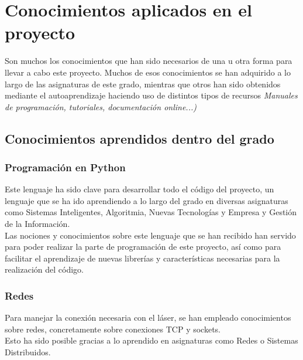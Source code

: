 
\section{Conocimientos aplicados en el proyecto}

Son muchos los conocimientos que han sido necesarios de una u otra forma para llevar a cabo este proyecto. Muchos de esos conocimientos se han adquirido a lo largo de las asignaturas de este grado, mientras que otros han sido obtenidos mediante el autoaprendizaje haciendo uso de distintos tipos de recursos \textit{Manuales de programación, tutoriales, documentación online...)}\\
	
\subsection{Conocimientos aprendidos dentro del grado}
	\subsubsection{Programación en Python}
		Este lenguaje ha sido clave para desarrollar todo el código del proyecto, un lenguaje que se ha ido aprendiendo a lo largo del grado en diversas asignaturas como Sistemas 					Inteligentes, Algoritmia, Nuevas Tecnologías y Empresa y Gestión de la Información.\\
		Las nociones y conocimientos sobre este lenguaje que se han recibido han servido para poder realizar la parte de programación de este proyecto, así como para facilitar el 					aprendizaje de nuevas librerías y características necesarias para la realización del código.\\
	\subsubsection{Redes}
		Para manejar la conexión necesaria con el láser, se han empleado conocimientos sobre redes, concretamente sobre conexiones TCP y sockets. \\ Esto ha sido posible gracias a lo 				aprendido en asignaturas como Redes o Sistemas Distribuidos.\\
